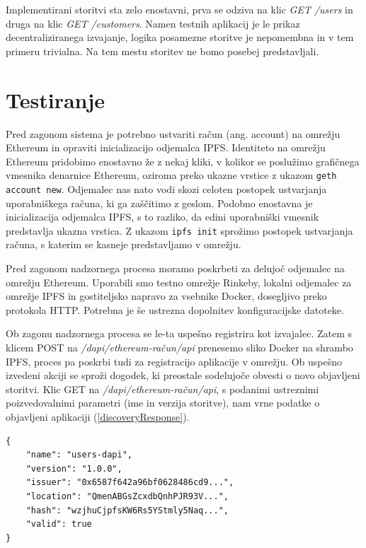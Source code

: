 \documentclass[a4paper, 12pt]{book}
\begin{document}
Implementirani storitvi sta zelo enostavni, prva se odziva na klic \textit{GET /users} in druga na klic \textit{GET /customers}.
Namen testnih aplikacij je le prikaz decentraliziranega izvajanje, logika posamezne storitve je nepomembna in v tem primeru trivialna.
Na tem mestu storitev ne bomo posebej predstavljali.

\section{Testiranje}
Pred zagonom sistema je potrebno ustvariti račun (ang. account) na omrežju Ethereum in opraviti inicializacijo odjemalca IPFS.
Identiteto na omrežju Ethereum pridobimo enostavno že z nekaj kliki, v kolikor se poslužimo gra\-fi\-čne\-ga vmesnika denarnice Ethereum, oziroma preko ukazne vrstice z ukazom \texttt{geth account new}.
Odjemalec nas nato vodi skozi celoten postopek ustvarjanja uporabniškega računa, ki ga zaščitimo z geslom.
Podobno enostavna je inicializacija odjemalca IPFS, s to razliko, da edini uporabniški vmesnik predstavlja ukazna vrstica.
Z ukazom \texttt{ipfs init} sprožimo postopek ustvarjanja računa, s katerim se kasneje predstavljamo v omrežju.

Pred zagonom nadzornega procesa moramo poskrbeti za delujoč odjemalec na omrežju Ethereum. Uporabili smo testno omrežje Rinkeby, lokalni odjemalec za omrežje IPFS in gostiteljsko napravo za vsebnike Docker, dosegljivo preko protokola HTTP.
Potrebna je še ustrezna dopolnitev konfiguracijske datoteke.

Ob zagonu nadzornega procesa se le-ta uspešno registrira kot izvajalec.
Zatem s klicem POST na \textit{/dapi/{ethereum-račun}/api} prenesemo sliko Docker na shrambo IPFS, proces pa poskrbi tudi za registracijo aplikacije v omrežju.
Ob uspešno izvedeni akciji se sproži dogodek, ki preostale sodelujoče obvesti o novo objavljeni storitvi.
Klic GET na \textit{/dapi/{ethereum-račun}/api}, s podanimi ustreznimi poizvedovalnimi parametri (ime in verzija storitve), nam vrne podatke o objavljeni aplikaciji (\ref{discoveryResponse}).

\begin{lstlisting}[caption={Odziv storitve ob uspešno odkriti registrirani aplikaciji},captionpos=b,label={discoveryResponse}]
{
	"name": "users-dapi",
	"version": "1.0.0",
	"issuer": "0x6587f642a96bf0628486cd9...",
	"location": "QmenABGsZcxdbQnhPJR93V...",
	"hash": "wzjhuCjpfsKW6Rs5YStmly5Naq...",
	"valid": true
}	
\end{lstlisting}
\end{document}
